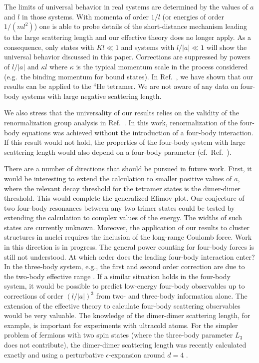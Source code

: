 \documentclass[prc,preprint,showpacs,tightenlines,%
nofootinbib]{revtex4}
\begin{document}
The limits of universal behavior in real systems are determined by
the values of $a$ and $l$ in those systems. 
With momenta of order $1/l$ (or energies of order
$1/(ml^2)$) one is able to probe details
of the short-distance mechanism leading to the large scattering
length and our effective theory does no longer apply.
As a consequence, only states with $Kl \ll 1$ and 
systems with $l/|a| \ll 1$ will show the universal behavior 
discussed in this paper. Corrections are suppressed by powers 
of $l/|a|$ and $\kappa l$ where $\kappa$ is the typical momentum
scale in the process considered (e.g.~the binding momentum for bound 
states). In Ref.~\cite{Platter04}, we have shown that our results
can be applied to the $^4$He tetramer. We are not aware of any 
data on four-body systems with large negative scattering length.

We also stress that the universality of our results relies on the 
validity of the renormalization group analysis in Ref.~\cite{Platter04}.
In this work, renormalization of the four-body equations was
achieved without the introduction of a four-body interaction.
If this result would not
hold, the properties of the four-body system with large scattering
length would also depend on a four-body parameter
(cf.~Ref.~\cite{Yama06}).

There are a number of directions that should be pursued in future work.
First, it would be interesting to extend the calculation to 
smaller positive values of $a$, where the relevant decay threshold for 
the tetramer states is the dimer-dimer threshold. This would
complete the generalized Efimov plot. Our conjecture of two
four-body resonances between any two trimer states could be tested
by extending the calculation to complex values of the energy. The 
widths of such states are currently unknown.
Moreover, the application of our results to cluster structures
in nuclei requires the inclusion of the long-range Coulomb force.
Work in this direction is in progress.
The general power counting for four-body forces is still not understood.
At which order does the leading four-body interaction enter? In the 
three-body system, e.g., the first and second order correction are 
due to the two-body effective range \cite{Platter:2006ev}. 
If a similar situation holds in the four-body system, 
it would be possible to predict low-energy four-body observables up to 
corrections of order $(l/|a|)^3$ from two- and three-body information alone. 
The extension of the effective theory to calculate four-body scattering
observables would be very valuable. 
The knowledge of the dimer-dimer scattering length, for example,
is important for experiments with ultracold atoms. For the simpler
problem of fermions with two spin states (where the three-body parameter
$L_3$ does not contribute), the dimer-dimer scattering length
was recently calculated exactly \cite{Petrov04}
and using a perturbative $\epsilon$-expansion around $d=4$ \cite{Rupak06}.
\end{document}
